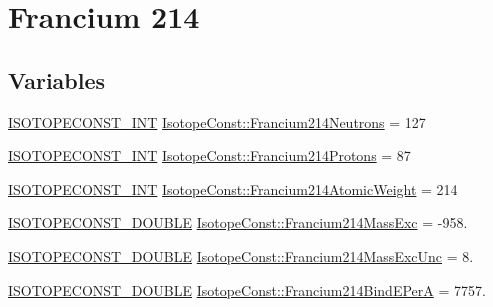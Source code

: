 \hypertarget{group___isotope_const-_francium-_fr214}{}\section{Francium 214}
\label{group___isotope_const-_francium-_fr214}
\subsection*{Variables}
\begin{DoxyCompactItemize}
\item 
\mbox{\hyperlink{group___isotope_const-_macros_ga5f18360b3e99483a35c32d789e62621c}{I\+S\+O\+T\+O\+P\+E\+C\+O\+N\+S\+T\+\_\+\+I\+NT}} \mbox{\hyperlink{group___isotope_const-_francium-_fr214_ga8b90c4a72de37cf321d0aab228a86c5c}{Isotope\+Const\+::\+Francium214\+Neutrons}} = 127
\item 
\mbox{\hyperlink{group___isotope_const-_macros_ga5f18360b3e99483a35c32d789e62621c}{I\+S\+O\+T\+O\+P\+E\+C\+O\+N\+S\+T\+\_\+\+I\+NT}} \mbox{\hyperlink{group___isotope_const-_francium-_fr214_gaca99c77d96fb1e75181aa63d235193e6}{Isotope\+Const\+::\+Francium214\+Protons}} = 87
\item 
\mbox{\hyperlink{group___isotope_const-_macros_ga5f18360b3e99483a35c32d789e62621c}{I\+S\+O\+T\+O\+P\+E\+C\+O\+N\+S\+T\+\_\+\+I\+NT}} \mbox{\hyperlink{group___isotope_const-_francium-_fr214_ga67e3f1ab114f97a9526045c007788e2e}{Isotope\+Const\+::\+Francium214\+Atomic\+Weight}} = 214
\item 
\mbox{\hyperlink{group___isotope_const-_macros_ga8f45a7272ce02c0b4c65c44636ed719a}{I\+S\+O\+T\+O\+P\+E\+C\+O\+N\+S\+T\+\_\+\+D\+O\+U\+B\+LE}} \mbox{\hyperlink{group___isotope_const-_francium-_fr214_gacbd57f246bbbaa0d4bccd5fe394a7c77}{Isotope\+Const\+::\+Francium214\+Mass\+Exc}} = -\/958.
\item 
\mbox{\hyperlink{group___isotope_const-_macros_ga8f45a7272ce02c0b4c65c44636ed719a}{I\+S\+O\+T\+O\+P\+E\+C\+O\+N\+S\+T\+\_\+\+D\+O\+U\+B\+LE}} \mbox{\hyperlink{group___isotope_const-_francium-_fr214_ga283589214aa753b09f25691094655aa1}{Isotope\+Const\+::\+Francium214\+Mass\+Exc\+Unc}} = 8.
\item 
\mbox{\hyperlink{group___isotope_const-_macros_ga8f45a7272ce02c0b4c65c44636ed719a}{I\+S\+O\+T\+O\+P\+E\+C\+O\+N\+S\+T\+\_\+\+D\+O\+U\+B\+LE}} \mbox{\hyperlink{group___isotope_const-_francium-_fr214_ga7e38a97114414eea8ad4148fd94958fe}{Isotope\+Const\+::\+Francium214\+Bind\+E\+PerA}} = 7757.
\item 

\end{DoxyCompactItemize}
